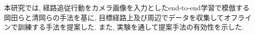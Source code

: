 
本研究では, 経路追従行動をカメラ画像を入力としたend-to-end学習で模倣する岡田ら\cite{okada-si2020}と清岡ら\cite{kiyooka-si}の手法を基に, 目標経路上及び周辺でデータを収集してオフラインで訓練する手法を提案した. また, 実験を通して提案手法の有効性を示した. 